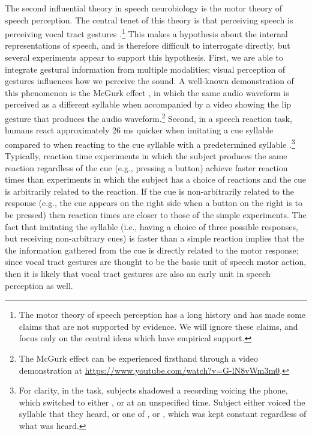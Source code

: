 The second influential theory
in speech neurobiology is the
motor theory of speech perception.
The central tenet of this theory
is that perceiving speech
is perceiving vocal tract gestures
\citep{liberman1985,galantucci2006}.\footnote{
  The motor theory of speech perception has a long history
  and has made some claims that are not supported by evidence.
  We will ignore these claims, and focus only on
  the central ideas which have empirical support.}
This makes a hypothesis about
the internal representations of speech,
and is therefore difficult
to interrogate directly,
but several experiments appear
to support this hypothesis.
First, we are able to integrate
gestural information from multiple modalities;
visual perception of gestures
influences how we perceive the sound.
A well-known demonstration of
this phenomenon is the McGurk effect
\citep{mcgurk1976},
in which the same audio waveform
is perceived as a different syllable
when accompanied by a video
showing the lip gesture that produces
the audio waveform.\footnote{
  The McGurk effect can be experienced firsthand through
  a video demonstration at
  \url{https://www.youtube.com/watch?v=G-lN8vWm3m0}.}
Second, in a speech reaction task,
humans react approximately 26 ms quicker
when imitating a cue syllable
compared to when reacting
to the cue syllable
with a predetermined syllable
\citep{fowler2003}.\footnote{
  For clarity, in the task, subjects
  shadowed a recording voicing the \ipa{[A]} phone,
  which switched to either \ipa{[pA]}, \ipa{[tA]} or \ipa{[kA]} at an
  unspecified time.
  Subject either voiced the syllable that they heard,
  or one of \ipa{[pA]}, \ipa{[tA]} or \ipa{[kA]},
  which was kept constant regardless of what was heard.}
Typically, reaction time experiments
in which the subject produces the same reaction
regardless of the cue (e.g., pressing a button)
achieve faster reaction times
than experiments in which the subject
has a choice of reactions
and the cue is arbitrarily related
to the reaction.
If the cue is non-arbitrarily related
to the response
(e.g., the cue appears on the right side
when a button on the right is to be pressed)
then reaction times are closer to those
of the simple experiments.
The fact that imitating the syllable
(i.e., having a choice of three possible responses,
but receiving non-arbitrary cues)
is faster than a simple reaction
implies that the the information gathered
from the cue is directly related
to the motor response;
since vocal tract gestures are thought
to be the basic unit of speech motor action,
then it is likely that vocal tract gestures
are also an early unit
in speech perception as well.

